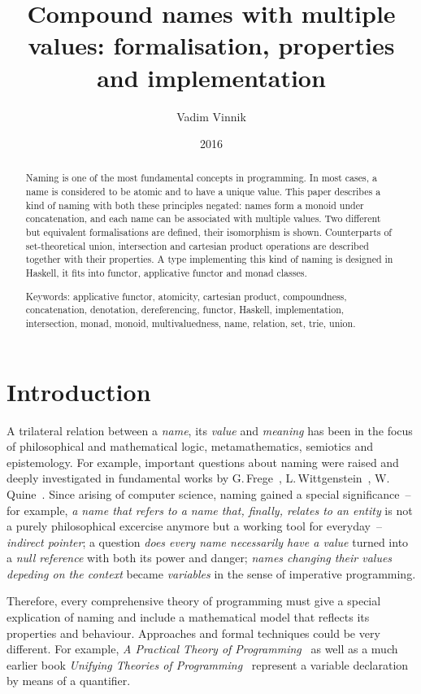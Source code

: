 \documentclass{article}
\title{Compound names with multiple values: formalisation, properties and implementation}
\author{Vadim Vinnik}
\date{2016}
\theoremstyle{definition}
\begin{document}
\maketitle

\begin{abstract}
Naming is one of the most fundamental concepts in programming.  In most
cases, a name is considered to be atomic and to have a unique value.  This
paper describes a kind of naming with both these principles negated: names form
a monoid under concatenation, and each name can be associated with multiple
values.  Two different but equivalent formalisations are defined, their
isomorphism is shown.  Counterparts of set-theoretical union, intersection and
cartesian product operations are described together with their properties.  A
type implementing this kind of naming is designed in Haskell, it fits into
functor, applicative functor and monad classes.

Keywords:
applicative functor,
atomicity,
cartesian product,
compoundness,
concatenation,
denotation,
dereferencing,
functor,
Haskell,
implementation,
intersection,
monad,
monoid,
multivaluedness,
name,
relation,
set,
trie,
union.
\end{abstract}

\tableofcontents



\section{Introduction}

A trilateral relation between a \emph{name}, its \emph{value} and
\emph{meaning} has been in the focus of philosophical and mathematical logic,
metamathematics, semiotics and epistemology.  For example, important questions
about naming
were raised and deeply investigated in fundamental works by
G.\,Frege~\cite{bib:frege},
L.\,Wittgenstein~\cite{bib:wittgenstein},
W.\,Quine~\cite{bib:quine}.
Since arising of computer science, naming gained a special significance~-- for
example, \emph{a name that refers to a name that, finally, relates to an
entity} is not a purely philosophical excercise anymore but a working tool for
everyday~-- \emph{indirect pointer}; a question \emph{does every name
necessarily have a value} turned into a \emph{null reference} with both its
power and danger; \emph{names changing their values depeding on the context}
became \emph{variables} in the sense of imperative programming.

Therefore, every comprehensive theory of programming must give a special
explication of naming and include a mathematical model that reflects its
properties and behaviour.  Approaches and formal techniques could be very
different.  For example, \emph{A Practical Theory of
Programming}~\cite{bib:ptop} as well as a much earlier book \emph{Unifying
Theories of Programming}~\cite{bib:utp} represent a variable declaration by
means of a quantifier.
\end{document}

